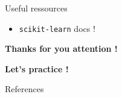 \documentclass{irdbeamer}
\begin{document}
\begin{frame}{Useful ressources}

\begin{itemize}
    \item \texttt{scikit-learn} docs !
\end{itemize}
\end{frame}

\begin{frame}[plain]
    \Huge{\textbf{Thanks for you attention !}}
    
    \vfill
    
    \LARGE{\textbf{Let's practice !}}
\end{frame}

\appendix
\begin{frame}[allowframebreaks]{References}
    {\footnotesize \printbibliography[heading=none]}
\end{frame}
\end{document}
